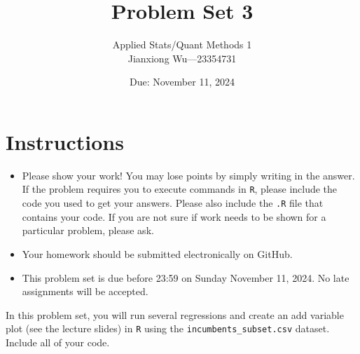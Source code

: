 \documentclass[12pt,letterpaper]{article}
\title{Problem Set 3}
\date{Due: November 11, 2024}
\author{Applied Stats/Quant Methods 1
	\\ Jianxiong Wu---23354731}
\begin{document}
	\maketitle
	\section*{Instructions}
	\begin{itemize}
		\item Please show your work! You may lose points by simply writing in the answer. If the problem requires you to execute commands in \texttt{R}, please include the code you used to get your answers. Please also include the \texttt{.R} file that contains your code. If you are not sure if work needs to be shown for a particular problem, please ask.
	\item Your homework should be submitted electronically on GitHub.
	\item This problem set is due before 23:59 on Sunday November 11, 2024. No late assignments will be accepted.

	\end{itemize}

		\vspace{.25cm}
	
\noindent In this problem set, you will run several regressions and create an add variable plot (see the lecture slides) in \texttt{R} using the \texttt{incumbents\_subset.csv} dataset. Include all of your code.

	\vspace{.5cm}
\end{document}
